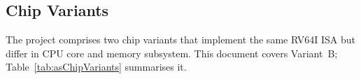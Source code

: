 
\subsection{Chip Variants}
\label{subsec:chipVariants}

The \aschip project comprises two chip variants that implement the same
RV64I ISA but differ in CPU core and memory subsystem. This document covers
Variant~B; Table~\ref{tab:asChipVariants} summarises it.

